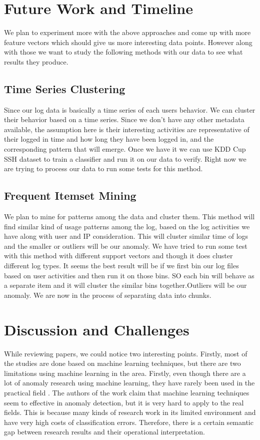 \documentclass [11pt]{article}
\begin{document}
\section{Future Work and Timeline}

We plan to experiment more with the above approaches and come up with more feature vectors which should give us more interesting data points. However along with those we want to study the following methods with our data to see what results they produce.

\subsection{Time Series Clustering}

Since our log data is basically a time series of each users behavior. We can cluster their behavior based on a time series. Since we don't have any other metadata available, the assumption here is their interesting activities are representative of their logged in time and how long they have been logged in, and the corresponding pattern that will emerge. Once we have it we can use KDD Cup SSH dataset to train a classifier and run it on our data to verify. Right now we are trying to process our data to run some tests for this method.

\subsection{Frequent Itemset Mining}
We plan to mine for patterns among the data and cluster them. This method will find similar kind of usage patterns among the log, based on the log activities we have along with user and IP consideration. This will cluster similar time of logs and the smaller or outliers will be our anomaly. We have tried to run some test with this method with different support vectors and though it does cluster different log types. It seems the best result will be if we first bin our log files based on user activities and then run it on those bins. SO each bin will behave as a separate item and it will cluster the similar bins together.Outliers will be our anomaly. We are now in the process of separating data into chunks.

\section{Discussion and Challenges}

While reviewing papers, we could notice two interesting points. Firstly, most of the studies are done based on machine learning techniques, but there are two limitations using machine learning in the area. Firstly, even though there are a lot of anomaly research using machine learning, they have rarely been used in the practical field \cite{Sommer2010}. The authors of the work \cite{Sommer2010} claim that machine learning techniques seem to effective in anomaly detection, but it is very hard to apply to the real fields. This is because many kinds of research work in its limited environment and have very high costs of classification errors. Therefore, there is a certain semantic gap between research results and their operational interpretation.
\end{document}
